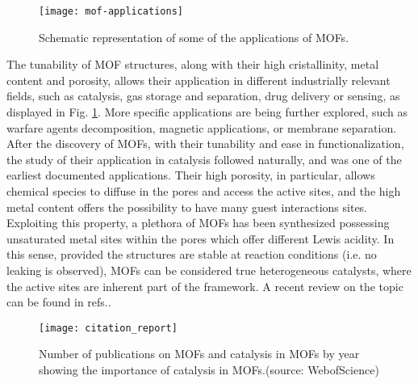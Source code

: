 %
%
\begin{figure}[htbp]
	\centering
 	\texttt{[image: mof-applications]}
	\caption{Schematic representation of some of the applications of MOFs.}
	\label{fig:mof-applications}
\end{figure}
%
%
\npar
The tunability of MOF structures, along with their high cristallinity, metal content and porosity, allows their application in different industrially relevant fields, such as catalysis, gas storage and separation, drug delivery or sensing, as displayed in Fig. \ref{fig:mof-applications}. More specific applications are being further explored, such as warfare agents decomposition, magnetic applications, or membrane separation. 
After the discovery of MOFs, with their tunability and ease in functionalization, the study of their application in catalysis followed naturally, and was one of the earliest documented applications\cite{Fujita1994}. 
Their high porosity, in particular, allows chemical species to diffuse in the pores and access the active sites, and the high metal content offers the possibility to have many guest interactions sites. Exploiting this property, a plethora of MOFs has been synthesized possessing unsaturated metal sites within the pores which offer different Lewis acidity. In this sense, provided the structures are stable at reaction conditions (i.e. no leaking is observed), MOFs can be considered true heterogeneous catalysts, where the active sites are inherent part of the framework. A recent review on the topic can be found in refs.\cite{rogge2017metal, yang2019catalysis}.
%
\begin{figure}[!htbp]
	\centering
 	\texttt{[image: citation\_report]}
	\caption{Number of publications on MOFs and catalysis in MOFs by year showing the importance of catalysis in MOFs.(source: WebofScience)}
	\label{fig:citation_report}
\end{figure}
%
